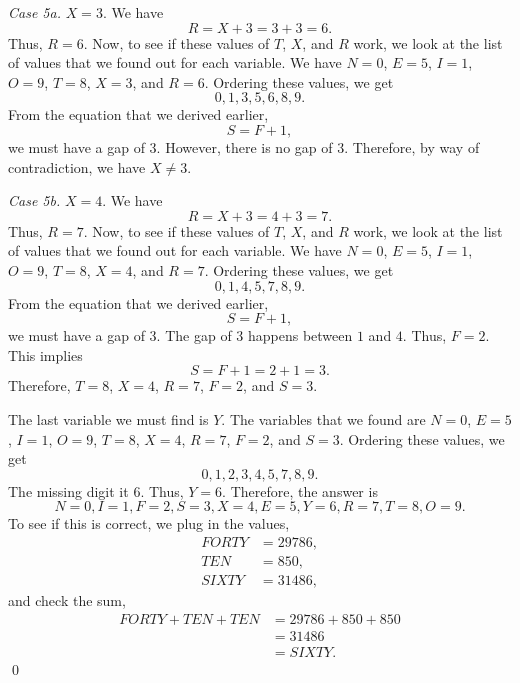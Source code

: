 \documentclass[12pt]{article}
\begin{document}
\noindent\textit{Case 5a.} $X=3$. We have
\[R=X+3=3+3=6.\]
Thus, $R=6$. Now, to see if these values of $T$, $X$, and $R$ work, we look at the list of values that we found out for each variable. We have $N=0$, $E=5$, $I=1$, $O=9$, $T=8$, $X=3$, and $R=6$. Ordering these values, we get
\[0,1,3,5,6,8,9.\]
From the equation that we derived earlier,
\[S=F+1,\]
we must have a gap of $3$. However, there is no gap of $3$. Therefore, by way of contradiction, we have $X\neq 3$.
\vspace{20px}

\noindent\textit{Case 5b.} $X=4$. We have
\[R=X+3=4+3=7.\]
Thus, $R=7$. Now, to see if these values of $T$, $X$, and $R$ work, we look at the list of values that we found out for each variable. We have $N=0$, $E=5$, $I=1$, $O=9$, $T=8$, $X=4$, and $R=7$. Ordering these values, we get
\[0,1,4,5,7,8,9.\]
From the equation that we derived earlier,
\[S=F+1,\]
we must have a gap of $3$. The gap of $3$ happens between $1$ and $4$. Thus, $F=2$. This implies
\[S=F+1=2+1=3.\]
Therefore, $\boxed{T=8}$, $\boxed{X=4}$, $\boxed{R=7}$, $\boxed{F=2}$, and $\boxed{S=3}$.
\newpage

\noindent The last variable we must find is $Y$. The variables that we found are $N=0$, $E=5$, $I=1$, $O=9$, $T=8$, $X=4$, $R=7$, $F=2$, and $S=3$. Ordering these values, we get
\[0,1,2,3,4,5,7,8,9.\]
The missing digit it $6$. Thus, $Y=6$. Therefore, the answer is \[\boxed{N=0},\boxed{I=1},\boxed{F=2},\boxed{S=3},\boxed{X=4},\boxed{E=5},\boxed{Y=6},\boxed{R=7},\boxed{T=8},\boxed{O=9}.\]
To see if this is correct, we plug in the values,
\begin{align*}
    FORTY&=29786,\\
    TEN&=850,\\
    SIXTY&=31486,
\end{align*}
and check the sum,
\begin{align*}
    FORTY+TEN+TEN&=29786+850+850\\
    &=31486\\
    &=SIXTY.
\end{align*}
\qed
\end{document}
